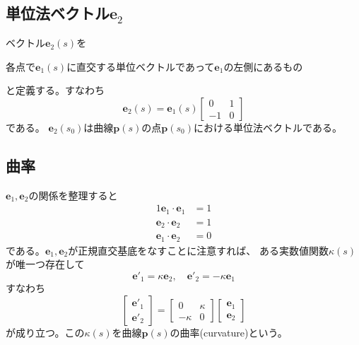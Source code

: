 \documentclass[a4j,disablejfam,dvipdfmx,papersize,slide,uplatex,21pt]{jsarticle}
\begin{document}
\subsection*{単位法ベクトル$\bm{e}_2$}
ベクトル$\bm{e}_2(s)$を
\begin{center}
    各点で$\bm{e}_1(s)$に直交する単位ベクトルであって$\bm{e}_1$の左側にあるもの
\end{center}
と定義する。すなわち
\begin{equation}
    \bm{e}_2(s) = \bm{e}_1(s)
    \left[
    \begin{array}{cc}
        0 & 1 \\
        -1 & 0
    \end{array}
    \right]
\end{equation}
である。
$\bm{e}_2(s_0)$は曲線$\bm{p}(s)$の点$\bm{p}(s_0)$における単位法ベクトルである。

\newpage
\subsection*{曲率}
$\bm{e}_1, \bm{e}_2$の関係を整理すると
\begin{alignat}{1}
    \bm{e}_1 \cdot \bm{e}_1 &= 1 \\
    \bm{e}_2 \cdot \bm{e}_2 &= 1 \\
    \bm{e}_1 \cdot \bm{e}_2 &= 0
\end{alignat}
である。$\bm{e}_1, \bm{e}_2$が正規直交基底をなすことに注意すれば、
ある実数値関数$\kappa(s)$が唯一つ存在して
\begin{equation}
    \bm{e}'_1 = \kappa \bm{e}_2,\quad
    \bm{e}'_2 = - \kappa \bm{e}_1
\end{equation}
すなわち
\begin{equation}
    \left[
        \begin{array}{c}
            \bm{e}'_1 \\
            \bm{e}'_2
        \end{array}
    \right]
    =
    \left[
        \begin{array}{cc}
            0 & \kappa \\
            -\kappa & 0
        \end{array}
    \right]
    \left[
        \begin{array}{c}
            \bm{e}_1 \\
            \bm{e}_2
        \end{array}
    \right]
\end{equation}
が成り立つ。この$\kappa(s)$を曲線$\bm{p}(s)$の曲率(curvature)という。
\end{document}

